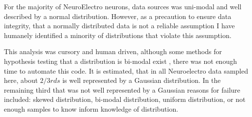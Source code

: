 
%

%    
%
%
%

%
For the majority of NeuroElectro neurons, data sources was uni-modal and well described by a normal distribution. However, as a precaution to ensure data integrity, that a normally distributed data is not a reliable assumption I have humanely identified a minority of distributions that violate this assumption.


This analysis was cursory and human driven, although some methods for hypothesis testing that a distribution is bi-modal exist \citep{maechler2013package}, there was not enough time to automate this code. It is estimated, that in all Neuroelectro data sampled here, about $2/3rds$ is well represented by a Gaussian distribution. In the remaining third that was not well represented by a Gaussian reasons for failure included: skewed distribution, bi-modal distribution, uniform distribution, or not enough samples to know inform knowledge of distribution.


